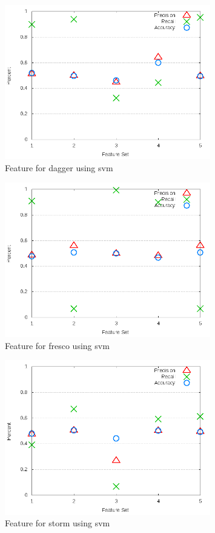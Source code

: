 \begin{figure}[!ht]
    \centering
        \includegraphics[width=0.8\textwidth]{images/svm/test_3/dagger_sample_range}
        \caption{Feature for dagger using \gls{svm}}
        \label{fig:test_3_dagger_svm}
\end{figure}

\begin{figure}[!ht]
    \centering
        \includegraphics[width=0.8\textwidth]{images/svm/test_3/fresco_sample_range}
        \caption{Feature for fresco using \gls{svm}}
        \label{fig:test_3_fresco_svm}
\end{figure}

\begin{figure}[!ht]
    \centering
        \includegraphics[width=0.8\textwidth]{images/svm/test_3/storm_sample_range}
        \caption{Feature for storm using \gls{svm}}
        \label{fig:test_3_storm_svm}
\end{figure}

